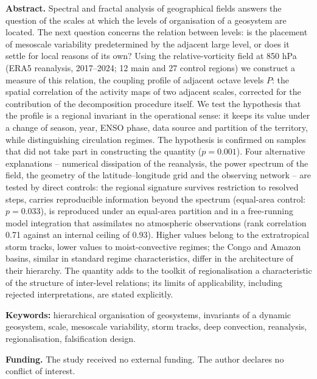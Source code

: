 \documentclass[12pt,a4paper]{article}
\begin{document}
\begin{singlespace}
\noindent\textbf{Abstract.} Spectral and fractal analysis of geographical fields answers the question of the scales at which the levels of organisation of a geosystem are located. The next question concerns the relation between levels: is the placement of mesoscale variability predetermined by the adjacent large level, or does it settle for local reasons of its own? Using the relative-vorticity field at 850 hPa (ERA5 reanalysis, 2017--2024; 12 main and 27 control regions) we construct a measure of this relation, the coupling profile of adjacent octave levels $P$: the spatial correlation of the activity maps of two adjacent scales, corrected for the contribution of the decomposition procedure itself. We test the hypothesis that the profile is a regional invariant in the operational sense: it keeps its value under a change of season, year, ENSO phase, data source and partition of the territory, while distinguishing circulation regimes. The hypothesis is confirmed on samples that did not take part in constructing the quantity ($p = 0.001$). Four alternative explanations -- numerical dissipation of the reanalysis, the power spectrum of the field, the geometry of the latitude--longitude grid and the observing network -- are tested by direct controls: the regional signature survives restriction to resolved steps, carries reproducible information beyond the spectrum (equal-area control: $p = 0.033$), is reproduced under an equal-area partition and in a free-running model integration that assimilates no atmospheric observations (rank correlation 0.71 against an internal ceiling of 0.93). Higher values belong to the extratropical storm tracks, lower values to moist-convective regimes; the Congo and Amazon basins, similar in standard regime characteristics, differ in the architecture of their hierarchy. The quantity adds to the toolkit of regionalisation a characteristic of the structure of inter-level relations; its limits of applicability, including rejected interpretations, are stated explicitly.

\smallskip
\noindent\textbf{Keywords:} hierarchical organisation of geosystems, invariants of a dynamic geosystem, scale, mesoscale variability, storm tracks, deep convection, reanalysis, regionalisation, falsification design.

\smallskip
\noindent\textbf{Funding.} The study received no external funding. The author declares no conflict of interest.
\end{singlespace}
\end{document}
